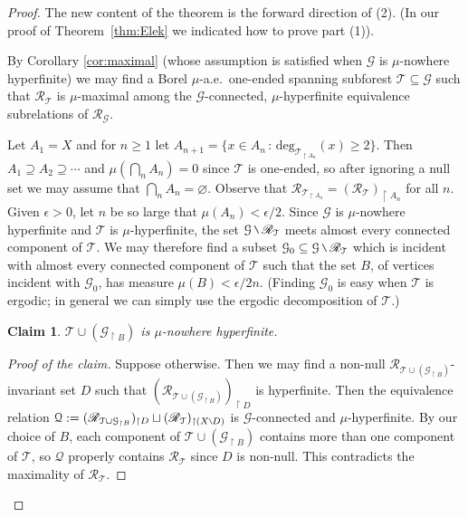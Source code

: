 \documentclass[11pt]{amsart}
\theoremstyle{definition}
\theoremstyle{plain}
\newtheorem*{claim}{Claim}
\newcommand{\<}{\langle}
\renewcommand{\>}{\rangle}
\renewcommand{\emptyset}{\varnothing}
\newcommand{\Ggraph}{\mathcal{G}}
\newcommand{\Tgraph}{\mathcal{T}}
\newcommand\RR{\mathscr{R}}
\newcommand{\mysetminusD}{\hbox{\tikz{\draw[line width=0.6pt,line cap=round] (3pt,0) -- (0,6pt);}}}
\newcommand{\mysetminusT}{\mysetminusD}
\newcommand{\mysetminusS}{\hbox{\tikz{\draw[line width=0.45pt,line cap=round] (2pt,0) -- (0,4pt);}}}
\newcommand{\mysetminusSS}{\hbox{\tikz{\draw[line width=0.4pt,line cap=round] (1.5pt,0) -- (0,3pt);}}}
\newcommand{\mysetminus}{\mathbin{\mathchoice{\mysetminusD}{\mysetminusT}{\mysetminusS}{\mysetminusSS}}}%
\begin{document}
\begin{proof}

The new content of the theorem is the forward direction of (2). (In our
proof of Theorem~\ref{thm:Elek} we indicated how to prove part (1)).

By Corollary \ref{cor:maximal} (whose assumption  is satisfied when $\Ggraph$ is $\mu$-nowhere hyperfinite)  we may find a Borel $\mu$-a.e.\ one-ended
spanning subforest $\Tgraph\subseteq \Ggraph$ such that
$\RR_{\Tgraph}$ is $\mu$-maximal
among the $\Ggraph$-connected, $\mu$-hyperfinite  equivalence subrelations of $\RR_{\Ggraph}$.


Let $A_1=X$ and for $n\geq 1$ let $A_{n+1} = \{
x\in A_{n} \, : \, \mathrm{deg}_{\Tgraph_{\restriction A_{n}}}(x) \geq 2 \}$. Then $A_1\supseteq A_2\supseteq\cdots$ and $\mu (\bigcap _n A_n ) =0$ since $\Tgraph$ is one-ended, so after ignoring a null set we may assume that $\bigcap _n A_n = \emptyset$. Observe that $\RR_{\Tgraph_{\restriction A_n}}={ (\RR_{\Tgraph})}_{\restriction A_n}$ for all $n$.
Given $\epsilon >0$, let $n$ be so large that $\mu (A_n) < \epsilon /2$. Since $\Ggraph$ is $\mu$-nowhere hyperfinite and $\Tgraph$ is $\mu$-hyperfinite, the set $\Ggraph\mysetminus \RR_{\Tgraph}$ meets almost every connected component of $\Tgraph$. We may therefore find a subset $\Ggraph_0\subseteq \Ggraph\mysetminus \RR_{\Tgraph}$ which is incident with almost every connected component of $\Tgraph$ such that the set $B$, of vertices incident with $\Ggraph_0$, has measure $\mu (B)<\epsilon /2n$. (Finding $\Ggraph_0$ is easy when $\Tgraph$ is ergodic; in general we can simply use the ergodic decomposition of $\Tgraph$.)

\begin{claim}\label{claim:nowhere} $\Tgraph\cup (\Ggraph_{\restriction B})$ is $\mu$-nowhere hyperfinite.\end{claim}

\begin{proof}[Proof of the claim] Suppose otherwise. Then we may find a non-null $\RR_{\Tgraph\cup (\Ggraph_{\restriction B})}$-invariant set $D$ such that $(\RR_{\Tgraph\cup(\Ggraph_{\restriction B})})_{\restriction D}$ is hyperfinite. Then the equivalence relation $\mathcal{Q} := (\RR_{\Tgraph\cup\Ggraph_{\restriction B}})_{\restriction D} \sqcup (\RR_{\Tgraph})_{\restriction (X\mysetminus D )}$ is $\Ggraph$-connected and $\mu$-hyperfinite. By our choice of $B$, each component of $\Tgraph\cup(\Ggraph_{\restriction B})$ contains more than one component of $\Tgraph$, so $\mathcal{Q}$ properly contains $\RR_{\Tgraph}$ since $D$ is non-null. This contradicts the maximality of $\RR_{\Tgraph}$.
\end{proof}


\end{proof}
\end{document}
